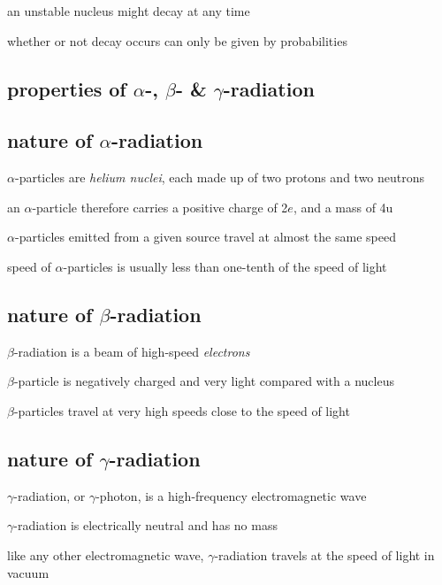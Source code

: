 an unstable nucleus might decay at any time

whether or not decay occurs can only be given by probabilities





\subsection{properties of $\alpha$-, $\beta$- \& $\gamma$-radiation}

\subsection*{nature of \texorpdfstring{$\alpha$}{\textalpha}-radiation}

$\alpha$-particles are \emph{helium nuclei}, each made up of two protons and two neutrons

an $\alpha$-particle therefore carries a positive charge of 2$e$, and a mass of 4u

$\alpha$-particles emitted from a given source travel at almost the same speed

speed of $\alpha$-particles is usually less than one-tenth of the speed of light

\subsection*{nature of \texorpdfstring{$\beta$}{\textbeta}-radiation}


$\beta$-radiation is a beam of high-speed \emph{electrons}

$\beta$-particle is negatively charged and very light compared with a nucleus

$\beta$-particles travel at very high speeds close to the speed of light

\subsection*{nature of \texorpdfstring{$\gamma$}{\textgamma}-radiation}

$\gamma$-radiation, or $\gamma$-photon, is a high-frequency electromagnetic wave

$\gamma$-radiation is electrically neutral and has no mass

like any other electromagnetic wave, $\gamma$-radiation travels at the speed of light in vacuum

